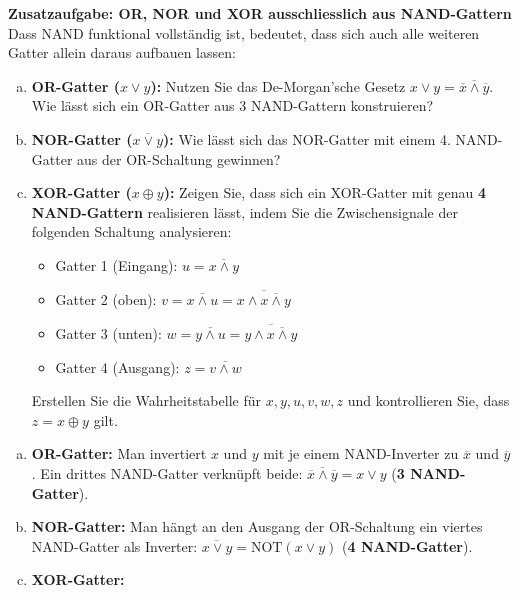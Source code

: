 \begin{mychallenge}\label{mychallenge:nand-universal}
    \textbf{Zusatzaufgabe: OR, NOR und XOR ausschliesslich aus NAND-Gattern}\\
    Dass NAND funktional vollständig ist, bedeutet, dass sich auch alle weiteren Gatter allein daraus aufbauen lassen:
    \begin{enumerate}[(a)]
        \item \textbf{OR-Gatter ($x \vee y$):} Nutzen Sie das De-Morgan'sche Gesetz $x \vee y = \overline{\overline{x} \wedge \overline{y}}$. Wie lässt sich ein OR-Gatter aus 3 NAND-Gattern konstruieren?
        \item \textbf{NOR-Gatter ($\overline{x \vee y}$):} Wie lässt sich das NOR-Gatter mit einem 4. NAND-Gatter aus der OR-Schaltung gewinnen?
        \item \textbf{XOR-Gatter ($x \oplus y$):} Zeigen Sie, dass sich ein XOR-Gatter mit genau \textbf{4 NAND-Gattern} realisieren lässt, indem Sie die Zwischensignale der folgenden Schaltung analysieren:
        \begin{itemize}
            \item Gatter 1 (Eingang): $u = \overline{x \wedge y}$
            \item Gatter 2 (oben): $v = \overline{x \wedge u} = \overline{x \wedge \overline{x \wedge y}}$
            \item Gatter 3 (unten): $w = \overline{y \wedge u} = \overline{y \wedge \overline{x \wedge y}}$
            \item Gatter 4 (Ausgang): $z = \overline{v \wedge w}$
        \end{itemize}
        Erstellen Sie die Wahrheitstabelle für $x, y, u, v, w, z$ und kontrollieren Sie, dass $z = x \oplus y$ gilt.
    \end{enumerate}
    \begin{myanswer}
        \begin{enumerate}[(a)]
            \item \textbf{OR-Gatter:} Man invertiert $x$ und $y$ mit je einem NAND-Inverter zu $\overline{x}$ und $\overline{y}$. Ein drittes NAND-Gatter verknüpft beide: $\overline{\overline{x} \wedge \overline{y}} = x \vee y$ (\textbf{3 NAND-Gatter}).
            \item \textbf{NOR-Gatter:} Man hängt an den Ausgang der OR-Schaltung ein viertes NAND-Gatter als Inverter: $\overline{x \vee y} = \text{NOT}(x \vee y)$ (\textbf{4 NAND-Gatter}).
            \item \textbf{XOR-Gatter:}

\end{enumerate}
\end{myanswer}
\end{mychallenge}
